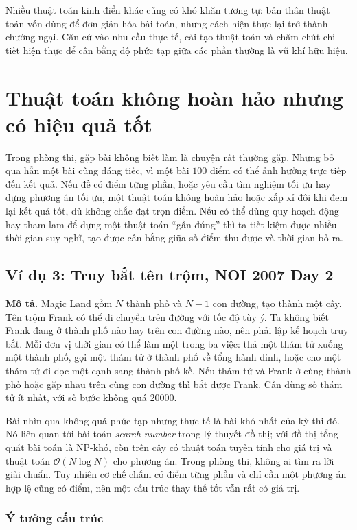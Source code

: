 \documentclass[11pt]{article}
\newcommand{\Oh}{\mathcal{O}}
\begin{document}
Nhiều thuật toán kinh điển khác cũng có khó khăn tương tự: bản thân thuật
toán vốn dùng để đơn giản hóa bài toán, nhưng cách hiện thực lại trở thành
chướng ngại. Căn cứ vào nhu cầu thực tế, cải tạo thuật toán và chăm chút chi
tiết hiện thực để cân bằng độ phức tạp giữa các phần thường là vũ khí hữu
hiệu.

\section{Thuật toán không hoàn hảo nhưng có hiệu quả tốt}

Trong phòng thi, gặp bài không biết làm là chuyện rất thường gặp. Nhưng bỏ
qua hẳn một bài cũng đáng tiếc, vì một bài \(100\) điểm có thể ảnh hưởng
trực tiếp đến kết quả. Nếu đề có điểm từng phần, hoặc yêu cầu tìm nghiệm tối
ưu hay dựng phương án tối ưu, một thuật toán không hoàn hảo hoặc xấp xỉ đôi
khi đem lại kết quả tốt, dù không chắc đạt trọn điểm. Nếu có thể dùng quy
hoạch động hay tham lam để dựng một thuật toán ``gần đúng'' thì ta tiết kiệm
được nhiều thời gian suy nghĩ, tạo được cân bằng giữa số điểm thu được và
thời gian bỏ ra.

\subsection{Ví dụ 3: Truy bắt tên trộm, NOI 2007 Day 2}

\textbf{Mô tả.} Magic Land gồm \(N\) thành phố và \(N-1\) con đường, tạo
thành một cây. Tên trộm Frank có thể di chuyển trên đường với tốc độ tùy ý.
Ta không biết Frank đang ở thành phố nào hay trên con đường nào, nên phải
lập kế hoạch truy bắt. Mỗi đơn vị thời gian có thể làm một trong ba việc:
thả một thám tử xuống một thành phố, gọi một thám tử ở thành phố về tổng
hành dinh, hoặc cho một thám tử đi dọc một cạnh sang thành phố kề. Nếu thám
tử và Frank ở cùng thành phố hoặc gặp nhau trên cùng con đường thì bắt được
Frank. Cần dùng số thám tử ít nhất, với số bước không quá \(20000\).

Bài nhìn qua không quá phức tạp nhưng thực tế là bài khó nhất của kỳ thi đó.
Nó liên quan tới bài toán \emph{search number} trong lý thuyết đồ thị; với
đồ thị tổng quát bài toán là NP-khó, còn trên cây có thuật toán tuyến tính
cho giá trị và thuật toán \(\Oh(N\log N)\) cho phương án. Trong phòng thi,
không ai tìm ra lời giải chuẩn. Tuy nhiên cơ chế chấm có điểm từng phần và
chỉ cần một phương án hợp lệ cũng có điểm, nên một cấu trúc thay thế tốt vẫn
rất có giá trị.

\subsubsection{Ý tưởng cấu trúc}
\end{document}
